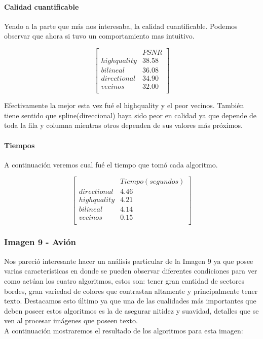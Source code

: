 {\paragraph{Calidad cuantificable}
Yendo a la parte que más nos interesaba, la calidad cuantificable. Podemos observar que ahora si tuvo un comportamiento mas intuitivo.

$$ 
\begin{bmatrix}
           &      PSNR     \\
       highquality    &   38.58   \\
       bilineal       &   36.08  \\
       directional    &   34.90    \\
       vecinos        &   32.00      \\
\end{bmatrix} 
$$

Efectivamente la mejor esta vez fué el highquality y el peor vecinos. También tiene sentido que spline(direccional) haya sido peor en calidad ya que depende de toda la fila y columna mientras otros dependen de sus valores más próximos.
\paragraph{Tiempos}
A continuación veremos cual fué el tiempo que tomó cada algoritmo.

$$ 
\begin{bmatrix}
           &      Tiempo (segundos)     \\
       directional    &   4.46    \\
       highquality    &   4.21   \\
       bilineal       &   4.14   \\
       vecinos        &   0.15      \\
\end{bmatrix} 
$$

\clearpage
\subsubsection{Imagen 9 - Avión}

Nos pareció interesante hacer un análisis particular de la Imagen 9 ya que posee varias características en donde se pueden observar diferentes condiciones para ver como actúan los cuatro algoritmos, estos son: tener gran cantidad de sectores bordes, gran variedad de colores que contrastan altamente y principalmente tener texto. Destacamos esto último ya que una de las cualidades más importantes que deben poseer estos algoritmos es la de asegurar nitidez y suavidad, detalles que se ven al procesar imágenes que poseen texto. \\
A continuación mostraremos el resultado de los algoritmos para esta imagen:

}
